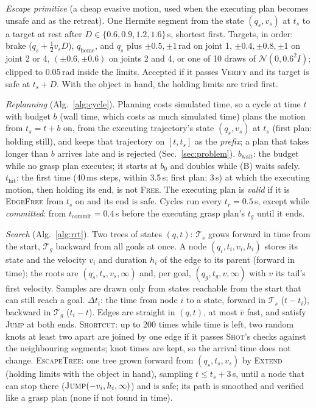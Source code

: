 \documentclass[conference]{IEEEtran}
\begin{document}
\emph{Escape primitive} (a cheap evasive motion, used when the executing plan becomes unsafe and as the retreat). One
Hermite segment from the state $(q_s,v_s)$ at $t_s$ to a target at rest after $D\in\{0.6,0.9,1.2,1.6\}$\,s,
shortest first. Targets, in order: brake ($q_s+\tfrac12v_sD$), $q_{\text{home}}$, and $q_s$ plus $\pm0.5,\pm1$\,rad
on joint 1, $\pm0.4,\pm0.8,\pm1$ on joint 2 or 4, $(\pm0.6,\pm0.6)$ on joints 2 and 4, or one of 10 draws of
$\mathcal N(0,0.6^2I)$; clipped to 0.05\,rad inside the limits. Accepted if it passes \textsc{Verify} and its target
is safe at $t_s+D$. With the object in hand, the holding limits are tried first.

\emph{Replanning} (Alg.~\ref{alg:cycle}). Planning costs simulated time, so a cycle at time $t$ with budget $b$ (wall
time, which costs as much simulated time) plans the motion from $t_s=t+b$ on, from the executing trajectory's state
$(q_s,v_s)$ at $t_s$ (first plan: holding still), and keeps that trajectory on $[t,t_s]$ as the \emph{prefix}; a plan
that takes longer than $b$ arrives late and is rejected (Sec.~\ref{sec:problem}). $b_{\text{wait}}$: the budget while
no grasp plan executes; it starts at $b_0$ and doubles while (B) waits safely. $t_{\text{hit}}$: the first time
(40\,ms steps, within 3.5\,s; first plan: 3\,s) at which the executing motion, then holding its end, is not
\textsc{Free}. The executing plan is \emph{valid} if it is \textsc{EdgeFree} from $t_s$ on and its end is safe.
Cycles run every $t_r=0.5$\,s, except while \emph{committed}: from $t_{\text{commit}}=0.4$\,s before the executing
grasp plan's $t_g$ until it ends.

\emph{Search} (Alg.~\ref{alg:rrt}). Two trees of states $(q,t)$: $\mathcal T_s$ grows forward in time from the start,
$\mathcal T_g$ backward from all goals at once. A node $(q_i,t_i,v_i,h_i)$ stores its state and the velocity $v_i$ and
duration $h_i$ of the edge to its parent (forward in time); the roots are $(q_s,t_s,v_s,\infty)$ and, per goal,
$(q_g,t_g,v,\infty)$ with $v$ its tail's first velocity. Samples are drawn only from states reachable from the start
that can still reach a goal. $\Delta t_i$: the time from node $i$ to a state, forward in $\mathcal T_s$
($t-t_i$), backward in $\mathcal T_g$ ($t_i-t$). Edges are straight in $(q,t)$, at most $\bar v$ fast, and satisfy
\textsc{Jump} at both ends. \textsc{Shortcut}: up to 200 times while time is left, two random knots at least two
apart are joined by one edge if it passes \textsc{Shot}'s checks against the neighbouring segments; knot times are
kept, so the arrival time does not change. \textsc{EscapeTree}: one tree grown forward from $(q_s,t_s,v_s)$ by
\textsc{Extend} (holding limits with the object in hand), sampling $t\le t_s+3$\,s, until a node that can stop there
($\textsc{Jump}(-v_i,h_i,\infty)$) and is safe; its path is smoothed and verified like a grasp plan (none if not
found in time).
\end{document}
